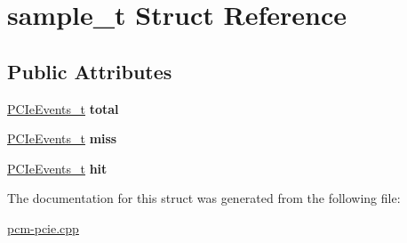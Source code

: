 \hypertarget{structsample__t}{}\section{sample\+\_\+t Struct Reference}
\label{structsample__t}
\subsection*{Public Attributes}
\begin{DoxyCompactItemize}
\item 
\mbox{\label{structsample__t_adda6c294067fd623532a92a20266e75a}} 
\mbox{\hyperlink{struct_p_c_ie_events__t}{P\+C\+Ie\+Events\+\_\+t}} {\bfseries total}
\item 
\mbox{\label{structsample__t_a88e5d78098bcfd43741b99ae218ad149}} 
\mbox{\hyperlink{struct_p_c_ie_events__t}{P\+C\+Ie\+Events\+\_\+t}} {\bfseries miss}
\item 
\mbox{\label{structsample__t_a2717168f76be8c4f1f46baf97231d9d6}} 
\mbox{\hyperlink{struct_p_c_ie_events__t}{P\+C\+Ie\+Events\+\_\+t}} {\bfseries hit}
\end{DoxyCompactItemize}


The documentation for this struct was generated from the following file\+:\begin{DoxyCompactItemize}
\item 
\mbox{\hyperlink{pcm-pcie_8cpp}{pcm-\/pcie.\+cpp}}\end{DoxyCompactItemize}
